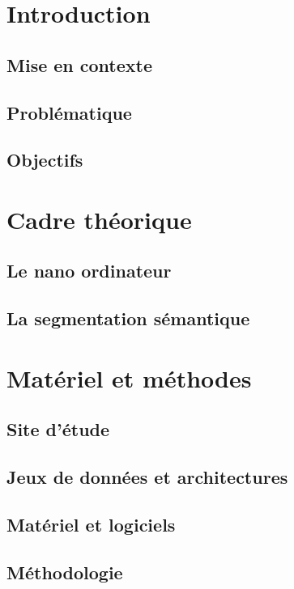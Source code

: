\documentclass[12pt, letterpaper]{article}
\begin{document}
\section{Introduction}
\subsection{Mise en contexte}

\subsection{Problématique}

\subsection{Objectifs}

\section{Cadre théorique}
\subsection{Le nano ordinateur}

\subsection{La segmentation sémantique}

\section{Matériel et méthodes}
\subsection{Site d'étude}

\subsection{Jeux de données et architectures }

\subsection{Matériel et logiciels}

\subsection{Méthodologie}

\end{document}
